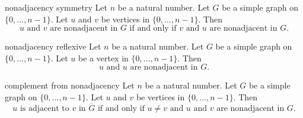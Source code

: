 \begin{cleanresult}{nonadjacency symmetry}
Let $n$ be a natural number.
Let $G$ be a simple graph on $\{0,\ldots,n-1\}$.
Let $u$ and $v$ be vertices in $\{0,\ldots,n-1\}$.
Then \[u\text{ and }v\text{ are nonadjacent in }G\text{ if and only if }v\text{ and }u\text{ are nonadjacent in }G.\]
\par{}
\end{cleanresult}

\begin{cleanresult}{nonadjacency reflexive}
Let $n$ be a natural number.
Let $G$ be a simple graph on $\{0,\ldots,n-1\}$.
Let $u$ be a vertex in $\{0,\ldots,n-1\}$.
Then \[u\text{ and }u\text{ are nonadjacent in }G.\]
\par{}
\end{cleanresult}

\begin{cleanresult}{complement from nonadjacency}
Let $n$ be a natural number.
Let $G$ be a simple graph on $\{0,\ldots,n-1\}$.
Let $u$ and $v$ be vertices in $\{0,\ldots,n-1\}$.
Then \[u\text{ is adjacent to }v\text{ in }\overline{G}\text{ if and only if }u\ne v\text{ and }u\text{ and }v\text{ are nonadjacent in }G.\]
\par{}
\end{cleanresult}

